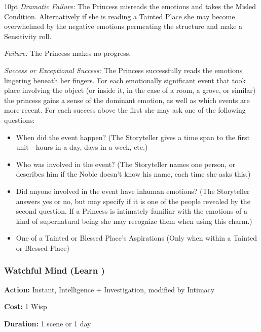   \begin{myindentpar}{10pt}  \emph{Dramatic Failure:} The Princess misreads the emotions and takes the Misled Condition. Alternatively if she is reading a Tainted Place she may become overwhelmed by the negative emotions permeating the structure and make a Sensitivity roll.

    \emph{Failure:} The Princess makes no progress. 

    \emph{Success or Exceptional Success:} The Princess successfully reads the emotions lingering beneath her fingers. For each emotionally significant event that took place involving the object (or inside it, in the case of a room, a grove, or similar) the princess gains a sense of the dominant emotion, as well as which events are more recent. For each success above the first she may ask one of the following questions: 
	
	\begin{itemize}
	
	\item When did the event happen? (The Storyteller gives a time span to the first unit - hours in a day, days
in a week, etc.)
	\item Who was involved in the event? (The Storyteller names one person, or describes him if the Noble
doesn't know his name, each time she asks this.)
    \item Did anyone involved in the event have inhuman emotions? (The Storyteller answers yes or no, but may specify if it is one of the people revealed by the second question. If a Princess is intimately familiar with the emotions of a kind of supernatural being she may recognize them when using this charm.)
	\item One of a Tainted or Blessed Place's Aspirations (Only when within a Tainted or Blessed Place) 
	
	\end{itemize}
	
\end{myindentpar}

\subsubsection*{Watchful Mind (Learn \textbullet\textbullet)}

\noindent \textbf{Action:} Instant, Intelligence + Investigation, modified by Intimacy

\noindent \textbf{Cost:} 1 Wisp

\noindent \textbf{Duration:} 1 scene or 1 day \\

